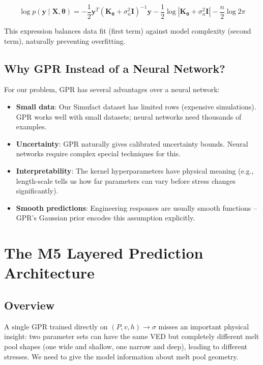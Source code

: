 \documentclass[12pt,a4paper]{report}
\begin{document}
\begin{equation}
\log p(\mathbf{y} \mid \mathbf{X}, \boldsymbol{\theta}) = -\frac{1}{2}\mathbf{y}^T\left(\mathbf{K}_{\boldsymbol{\theta}} + \sigma_n^2 \mathbf{I}\right)^{-1}\mathbf{y} - \frac{1}{2}\log\left|\mathbf{K}_{\boldsymbol{\theta}} + \sigma_n^2 \mathbf{I}\right| - \frac{n}{2}\log 2\pi
\end{equation}

This expression balances data fit (first term) against model complexity (second term), naturally preventing overfitting.

\section{Why GPR Instead of a Neural Network?}

For our problem, GPR has several advantages over a neural network:
\begin{itemize}
  \item \textbf{Small data}: Our Simufact dataset has limited rows (expensive simulations). GPR works well with small datasets; neural networks need thousands of examples.
  \item \textbf{Uncertainty}: GPR naturally gives calibrated uncertainty bounds. Neural networks require complex special techniques for this.
  \item \textbf{Interpretability}: The kernel hyperparameters have physical meaning (e.g., length-scale tells us how far parameters can vary before stress changes significantly).
  \item \textbf{Smooth predictions}: Engineering responses are usually smooth functions -- GPR's Gaussian prior encodes this assumption explicitly.
\end{itemize}

\chapter{The M5 Layered Prediction Architecture}

\section{Overview}

A single GPR trained directly on $(P, v, h) \rightarrow \sigma$ misses an important physical insight: two parameter sets can have the same VED but completely different melt pool shapes (one wide and shallow, one narrow and deep), leading to different stresses. We need to give the model information about melt pool geometry.
\end{document}
